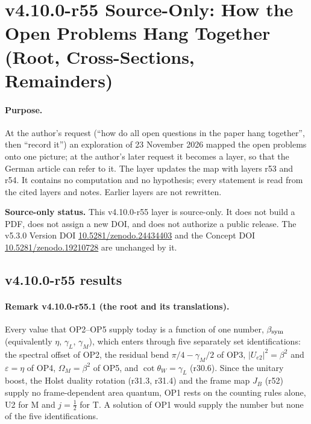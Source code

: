
\clearpage
\section*{v4.10.0-r55 Source-Only: How the Open Problems Hang Together (Root, Cross-Sections, Remainders)}
\label{sec:v4100-r55-cross-map}

\paragraph{Purpose.}
At the author's request (``how do all open questions in the paper hang together'', then ``record it'') an exploration of 23 November 2026
mapped the open problems onto one picture; at the author's later request it becomes a layer, so that the German article can refer to it.  The
layer updates the map with layers r53 and r54.  It contains no computation and no hypothesis; every statement is read from the cited layers and
notes.  Earlier layers are not rewritten.

\noindent\textbf{Source-only status.}
This v4.10.0-r55 layer is source-only.  It does not build a PDF, does not assign a new DOI,
and does not authorize a public release.  The v5.3.0 Version DOI
\href{https://doi.org/10.5281/zenodo.24434403}{10.5281/zenodo.24434403} and the Concept DOI
\href{https://doi.org/10.5281/zenodo.19210728}{10.5281/zenodo.19210728} are unchanged by it.

\subsection*{v4.10.0-r55 results}
\label{subsec:v4100-r55-results}

\paragraph{Remark v4.10.0-r55.1 (the root and its translations).}
Every value that OP2--OP5 supply today is a function of one number, \(\beta_{\rm sym}\) (equivalently \(\eta\), \(\gamma_L\), \(\gamma_M\)), which enters through five separately
set identifications: the spectral offset of OP2, the residual bend \(\pi/4-\gamma_M/2\) of OP3, \(|U_{e2}|^2=\beta^2\) and \(\varepsilon=\eta\) of OP4, \(\Omega_M=\beta^2\) of OP5, and
\(\cot\theta_W=\gamma_L\) (r30.6).  Since the unitary boost, the Holst duality rotation (r31.3, r31.4) and the frame map \(J_B\) (r52) supply no frame-dependent area
quantum, OP1 rests on the counting rules alone, U2 for M and \(j=\tfrac12\) for T.  A solution of OP1 would supply the number but none of the five
identifications.

